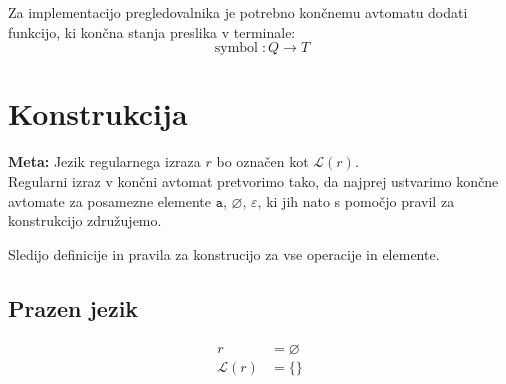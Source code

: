 \documentclass{report}
\DeclareMathOperator{\acc}{symbol}
\newcommand{\Special}[1]{\textbf{#1}}
\newcommand{\Empty}{\varnothing}
\newcommand{\Null}{\varepsilon}
\newcommand{\Language}[1]{\mathcal{L}(#1)}
\newcommand{\Char}[1]{\texttt{#1}}
\begin{document}
Za implementacijo pregledovalnika je potrebno končnemu avtomatu dodati funkcijo, ki končna stanja preslika v terminale:
\begin{equation*}
  \acc: Q \rightarrow T
\end{equation*}

\section{Konstrukcija}

\Special{Meta:} Jezik regularnega izraza $r$ bo označen kot $\Language{r}$.\\

Regularni izraz v končni avtomat pretvorimo tako, da najprej ustvarimo končne avtomate za posamezne elemente $\Char{a}$, $\Empty$, $\Null$, ki jih nato s pomočjo pravil za konstrukcijo združujemo.

%
%
%
%

Sledijo definicije in pravila za konstrucijo za vse operacije in elemente.

\subsection{Prazen jezik}
\begin{tcolorbox}[title={Definicija}]
\begin{equation*}
  \begin{aligned}
    r &= \Empty\\
    \Language{r} &= \{\}
  \end{aligned}
\end{equation*}
\end{tcolorbox}
\end{document}
